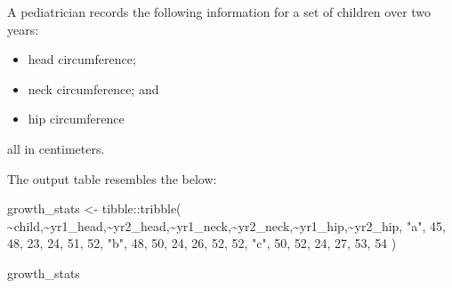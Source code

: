 \documentclass[
  letterpaper,
  DIV=11,
  numbers=noendperiod]{scrreprt}
\newenvironment{Shaded}{\begin{snugshade}}{\end{snugshade}}
\newcommand{\DecValTok}[1]{\textcolor[rgb]{0.68,0.00,0.00}{#1}}
\newcommand{\FunctionTok}[1]{\textcolor[rgb]{0.28,0.35,0.67}{#1}}
\newcommand{\NormalTok}[1]{\textcolor[rgb]{0.00,0.23,0.31}{#1}}
\newcommand{\OtherTok}[1]{\textcolor[rgb]{0.00,0.23,0.31}{#1}}
\newcommand{\SpecialCharTok}[1]{\textcolor[rgb]{0.37,0.37,0.37}{#1}}
\newcommand{\StringTok}[1]{\textcolor[rgb]{0.13,0.47,0.30}{#1}}
\providecommand{\tightlist}{%
  \setlength{\itemsep}{0pt}\setlength{\parskip}{0pt}}\usepackage{longtable,booktabs,array}
\begin{document}
\begin{tcolorbox}[enhanced jigsaw, colframe=quarto-callout-tip-color-frame, rightrule=.15mm, opacityback=0, breakable, coltitle=black, colbacktitle=quarto-callout-tip-color!10!white, bottomrule=.15mm, leftrule=.75mm, toprule=.15mm, arc=.35mm, bottomtitle=1mm, colback=white, left=2mm, opacitybacktitle=0.6, titlerule=0mm, title=\textcolor{quarto-callout-tip-color}{\faLightbulb}\hspace{0.5em}{Practice}, toptitle=1mm]

A pediatrician records the following information for a set of children
over two years:

\begin{itemize}
\tightlist
\item
  head circumference;
\item
  neck circumference; and
\item
  hip circumference
\end{itemize}

all in centimeters.

The output table resembles the below:

\begin{Shaded}
\begin{Highlighting}[]
\NormalTok{growth\_stats }\OtherTok{\textless{}{-}} 
\NormalTok{  tibble}\SpecialCharTok{::}\FunctionTok{tribble}\NormalTok{(}
    \SpecialCharTok{\textasciitilde{}}\NormalTok{child,}\SpecialCharTok{\textasciitilde{}}\NormalTok{yr1\_head,}\SpecialCharTok{\textasciitilde{}}\NormalTok{yr2\_head,}\SpecialCharTok{\textasciitilde{}}\NormalTok{yr1\_neck,}\SpecialCharTok{\textasciitilde{}}\NormalTok{yr2\_neck,}\SpecialCharTok{\textasciitilde{}}\NormalTok{yr1\_hip,}\SpecialCharTok{\textasciitilde{}}\NormalTok{yr2\_hip,}
       \StringTok{"a"}\NormalTok{,       }\DecValTok{45}\NormalTok{,       }\DecValTok{48}\NormalTok{,       }\DecValTok{23}\NormalTok{,       }\DecValTok{24}\NormalTok{,      }\DecValTok{51}\NormalTok{,      }\DecValTok{52}\NormalTok{,}
       \StringTok{"b"}\NormalTok{,       }\DecValTok{48}\NormalTok{,       }\DecValTok{50}\NormalTok{,       }\DecValTok{24}\NormalTok{,       }\DecValTok{26}\NormalTok{,      }\DecValTok{52}\NormalTok{,      }\DecValTok{52}\NormalTok{,}
       \StringTok{"c"}\NormalTok{,       }\DecValTok{50}\NormalTok{,       }\DecValTok{52}\NormalTok{,       }\DecValTok{24}\NormalTok{,       }\DecValTok{27}\NormalTok{,      }\DecValTok{53}\NormalTok{,      }\DecValTok{54}
\NormalTok{    )}

\NormalTok{growth\_stats}
\end{Highlighting}
\end{Shaded}


\end{tcolorbox}
\end{document}
